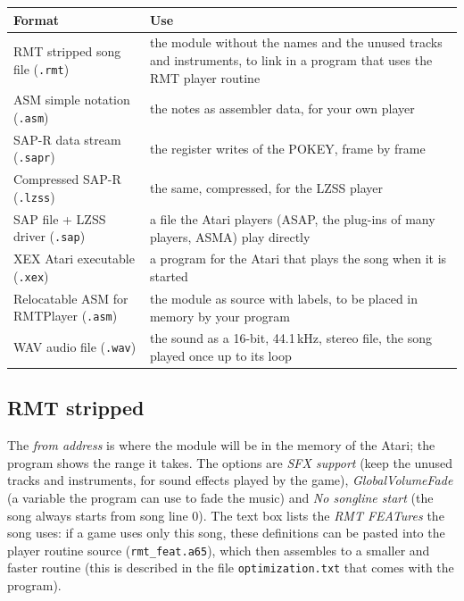 \begin{center}
\begin{tabular}{@{}p{4.2cm}p{9.6cm}@{}}
\toprule
Format & Use \\ \midrule
RMT stripped song file (\texttt{.rmt}) & the module without the names and the unused tracks and instruments, to link in a program that uses
  the RMT player routine \\
ASM simple notation (\texttt{.asm}) & the notes as assembler data, for your own player \\
SAP-R data stream (\texttt{.sapr}) & the register writes of the POKEY, frame by frame \\
Compressed SAP-R (\texttt{.lzss}) & the same, compressed, for the LZSS player \\
SAP file + LZSS driver (\texttt{.sap}) & a file the Atari players (ASAP, the plug-ins of many players, ASMA) play directly \\
XEX Atari executable (\texttt{.xex}) & a program for the Atari that plays the song when it is started \\
Relocatable ASM for RMTPlayer (\texttt{.asm}) & the module as source with labels, to be placed in memory by your program \\
WAV audio file (\texttt{.wav}) & the sound as a 16-bit, 44.1\,kHz, stereo file, the song played once up to its loop \\
\bottomrule
\end{tabular}
\end{center}

\subsection{RMT stripped}


The \emph{from address} is where the module will be in the memory of the Atari; the program shows the range it takes. The
options are \emph{SFX support} (keep the unused tracks and instruments, for sound effects played by the game),
\emph{GlobalVolumeFade} (a variable the program can use to fade the music) and \emph{No songline start} (the song always starts from
song line 0). The text box lists the \emph{RMT FEATures} the song uses: if a game uses only this song, these definitions can be pasted into
the player routine source (\texttt{rmt\_feat.a65}), which then assembles to a smaller and faster routine
(this is described in the file \texttt{optimization.txt} that comes with the program).

